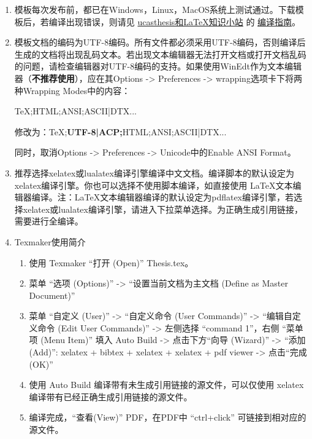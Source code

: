     \begin{enumerate}
        \item 模板每次发布前，都已在Windows，Linux，MacOS系统上测试通过。下载模板后，若编译出现错误，则请见 \href{https://github.com/mohuangrui/ucasthesis/wiki}{ucasthesis和\LaTeX{}知识小站} 的 \href{https://github.com/mohuangrui/ucasthesis/wiki/%E7%BC%96%E8%AF%91%E6%8C%87%E5%8D%97}{编译指南}。

            \item 模板文档的编码为UTF-8编码。所有文件都必须采用UTF-8编码，否则编译后生成的文档将出现乱码文本。若出现文本编辑器无法打开文档或打开文档乱码的问题，请检查编辑器对UTF-8编码的支持。如果使用WinEdt作为文本编辑器（\textbf{不推荐使用}），应在其Options -> Preferences -> wrapping选项卡下将两种Wrapping Modes中的内容：

                TeX;HTML;ANSI;ASCII|DTX...

                修改为：TeX;\textbf{UTF-8|ACP;}HTML;ANSI;ASCII|DTX...

                同时，取消Options -> Preferences -> Unicode中的Enable ANSI Format。

            \item 推荐选择xelatex或lualatex编译引擎编译中文文档。编译脚本的默认设定为xelatex编译引擎。你也可以选择不使用脚本编译，如直接使用 \LaTeX{}文本编辑器编译。注：\LaTeX{}文本编辑器编译的默认设定为pdflatex编译引擎，若选择xelatex或lualatex编译引擎，请进入下拉菜单选择。为正确生成引用链接，需要进行全编译。

            \item Texmaker使用简介
                \begin{enumerate}
                        \footnotesize
                    \item 使用 Texmaker “打开 (Open)” Thesis.tex。
                    \item 菜单 “选项 (Options)” -> “设置当前文档为主文档 (Define as Master Document)”
                    \item 菜单 “自定义 (User)” -> “自定义命令 (User Commands)” -> “编辑自定义命令 (Edit User Commands)” -> 左侧选择 “command 1”，右侧 “菜单项 (Menu Item)” 填入 Auto Build -> 点击下方“向导 (Wizard)” -> “添加 (Add)”: xelatex + bibtex + xelatex + xelatex + pdf viewer -> 点击“完成 (OK)”
                    \item 使用 Auto Build 编译带有未生成引用链接的源文件，可以仅使用 xelatex 编译带有已经正确生成引用链接的源文件。
                    \item 编译完成，“查看(View)” PDF，在PDF中 “ctrl+click” 可链接到相对应的源文件。
                \end{enumerate}


\end{enumerate}
